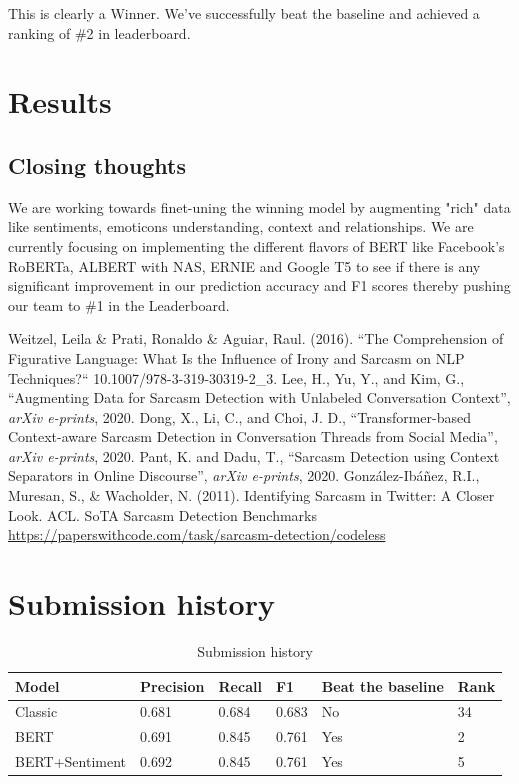 \documentclass[conference]{IEEEtran}
\begin{document}
This is clearly a Winner. We’ve successfully beat the baseline and achieved a ranking of \#2 in leaderboard.

\section{Results}

\subsection{Closing thoughts}
We are working towards finet-uning the winning model by augmenting "rich" data like sentiments, emoticons understanding, context and relationships. We are currently focusing on implementing the different flavors of BERT like  Facebook’s RoBERTa, ALBERT with NAS, ERNIE and Google T5 to see if there is any significant improvement in our prediction accuracy and F1 scores thereby pushing our team to \#1 in the Leaderboard.


\begin{thebibliography}{00}
	 Weitzel, Leila \& Prati, Ronaldo \& Aguiar, Raul. (2016). ``The Comprehension of Figurative Language: What Is the Influence of Irony and Sarcasm on NLP Techniques?`` 10.1007/978-3-319-30319-2\_3. 
	 Lee, H., Yu, Y., and Kim, G., “Augmenting Data for Sarcasm Detection with Unlabeled Conversation Context”, \textit{arXiv e-prints}, 2020.
	 Dong, X., Li, C., and Choi, J. D., “Transformer-based Context-aware Sarcasm Detection in Conversation Threads from Social Media”, \textit{arXiv e-prints}, 2020.
	 Pant, K. and Dadu, T., “Sarcasm Detection using Context Separators in Online Discourse”, \textit{arXiv e-prints}, 2020.
	 González-Ibáñez, R.I., Muresan, S., \& Wacholder, N. (2011). Identifying Sarcasm in Twitter: A Closer Look. ACL.
	 SoTA Sarcasm Detection Benchmarks \url{https://paperswithcode.com/task/sarcasm-detection/codeless}

\end{thebibliography}

\appendices

\section{Submission history}

\begin{table}[htbp]
	\caption{Submission history}
	\begin{center}
		\begin{tabular}{|l|l|l|l|l|l|}
			\hline
			\textbf{Model} & \textbf{Precision} & \textbf{Recall} & \textbf{F1} & \textbf{Beat the baseline} & \textbf{Rank} \\ \hline
			Classic & 0.681 & 0.684 & 0.683 & No  & 34 \\ \hline
			BERT & 0.691 & 0.845 & 0.761 & Yes  & 2 \\ \hline
			BERT+Sentiment & 0.692 & 0.845 & 0.761 & Yes & 5 \\ \hline
		\end{tabular}
		\label{tab3}
	\end{center}
\end{table}
\end{document}
